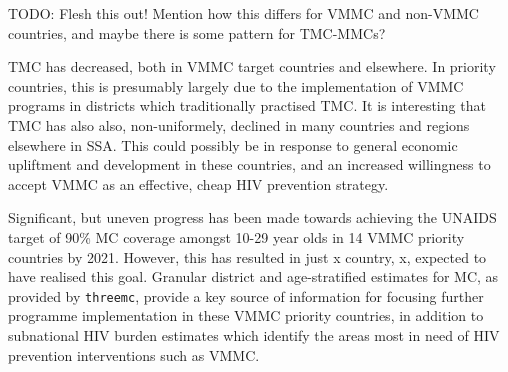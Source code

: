 \documentclass{article}
\begin{document}
TODO: Flesh this out! Mention how this differs for VMMC and non-VMMC countries, and maybe there is some pattern for TMC-MMCs?

TMC has decreased, both in VMMC target countries and elsewhere. 
In priority countries, this is presumably largely due to the implementation of VMMC programs in districts which traditionally practised TMC. 
It is interesting that TMC has also also, non-uniformely, declined in many countries and regions elsewhere in SSA. 
This could possibly be in response to general economic upliftment and development in these countries, and an increased willingness to accept VMMC as an effective, cheap HIV prevention strategy. 

Significant, but uneven progress has been made towards achieving the UNAIDS target of 90\% 
MC coverage amongst 10-29 year olds in 14 VMMC priority countries by 2021.  
However, this has resulted in just x country, x, expected to have realised this goal.
Granular district and age-stratified estimates for MC, as provided by \verb|threemc|, provide a key source of information for focusing further programme implementation in these VMMC priority countries, in addition to subnational HIV burden estimates which identify the areas most in need of HIV prevention interventions such as VMMC. 

\end{document}
